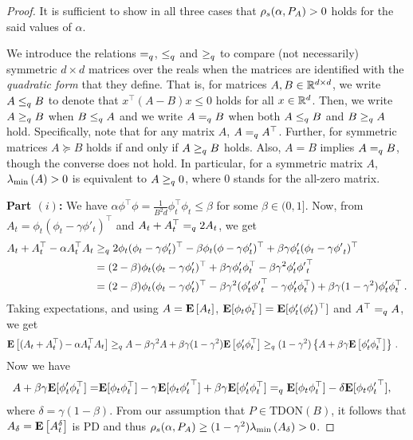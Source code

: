 \thtdadmis*
\begin{proof}
It is sufficient to show in all three cases that $\rho_s(\alpha,P_A)>0$ holds for the said values of $\alpha$. 

We introduce the relations $=_q$, $\leq_q$ and $\geq_q$ to compare (not necessarily) symmetric $d\times d$ matrices
over the reals when the matrices are identified with the \emph{quadratic form} that they define.
That is, for matrices $A, B\in \mathbb{R}^{d \times d}$, we write $A \leq_q B$ to denote that $x^\top (A-B) x \leq 0 $ holds for all $x\in \mathbb{R}^d$. Then, we write $A \geq_q B$ when $B \leq_q A$ and we write $A =_q B$ when both $A \leq_q B$ and $B \geq_q A$ hold. 
Specifically, note that for any matrix $A$, $A=_q A^\top$.
Further, for symmetric matrices $A \succeq B$ holds if and only if $A \geq_q B$ holds. 
Also, $A=B$ implies $A =_q B$, though the converse does not hold.
In particular, for a symmetric matrix $A$, $\lambda_{\min}\left(A\right)>0$ is equivalent to $A \geq_q 0$, where $0$ stands for the all-zero matrix.

\textbf{Part $(i)$:}  We have $\alpha\phi^\top\phi=\frac{1}{B^2d}\phi^\top_t\phi_t\le \beta$ for some $\beta\in (0,1]$. Now, from $A_t = \phi_t(\phi_t-\gamma \phi'_t)^\top$ and $A_t+A_t^\top =_q 2 A_t$, we get
\begin{align*}
A_t+A_t^\top -\alpha A_t^\top A_t 
&\geq_q 2\phi_t(\phi_t-\gamma\phi'_t)^\top -\beta\phi_t(\phi-\gamma\phi'_t)^\top+\beta\gamma\phi'_t(\phi_t-\gamma{\phi'}_t)^\top\\
&= (2-\beta)\phi_t(\phi_t-\gamma\phi'_t)^\top 
	+\beta\gamma\phi'_t\phi^\top_t-\beta\gamma^2\phi'_t{\phi'}_t^\top \\
&= (2-\beta)\phi_t(\phi_t-\gamma\phi'_t)^\top
	 -\beta\gamma^2(\phi'_t{\phi'}_t^\top-\gamma\phi'_t\phi^\top_t)
	 +\beta\gamma(1-\gamma^2)\phi'_t\phi_t^\top\,.
\end{align*}
Taking expectations, and using $A = \mathbf{E}\left[A_t\right]$,  $\mathbf{E}[ \phi_t\phi_t^\top] = \mathbf{E}[ \phi_t' (\phi_t')^\top]$
and $A^\top =_q A$, we get 
\begin{align*}
\mathbf{E}\left[ (A_t+A_t^\top)-\alpha A_t^\top A_t\right] &\geq_q  A -\beta\gamma^2 A+\beta\gamma(1-\gamma^2)\mathbf{E}\left[\phi'_t\phi_t^\top\right]
\geq_q (1-\gamma^2)\left\{A +\beta\gamma\mathbf{E}\left[\phi'_t\phi_t^\top\right]\right\}\,.
\end{align*}
Now we have 
\begin{align*}
A +\beta\gamma\mathbf{E}[\phi'_t\phi_t^\top]=& \mathbf{E}[\phi_t\phi_t^\top]-\gamma\mathbf{E}[\phi_t{\phi'_t}^\top] +\beta\gamma\mathbf{E}[\phi'_t\phi_t^\top]
=_q\mathbf{E}[\phi_t\phi_t^\top]-\delta\mathbf{E}[\phi_t{\phi'_t}^\top],
\end{align*}
where $\delta=\gamma(1-\beta)$. 
From our assumption that $P\in \text{TDON}(B)$, it follows that $A_{\delta}=\mathbf{E}\left[A_t^\delta\right]$ is PD
and thus $\rho_s(\alpha,P_A) \ge (1-\gamma^2) \lambda_{\min}\left( A_\delta\right) >0$.


\end{proof}

